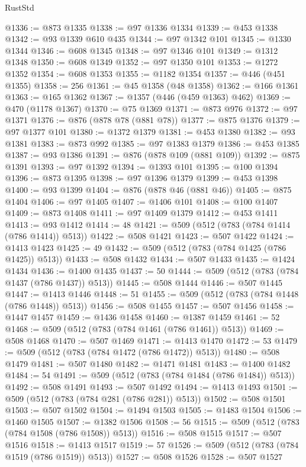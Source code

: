 \begin{lexlean}{RustStd}
\begin{coremodule}
@1336 := @873 @1335
@1338 := @97 @1336 @1334
@1339 := @453 @1338
@1342 := @93 @1339 @610 @435
@1344 := @97 @1342 @101
@1345 := @1330 @1344
@1346 := @608 @1345
@1348 := @97 @1346 @101
@1349 := @1312 @1348
@1350 := @608 @1349
@1352 := @97 @1350 @101
@1353 := @1272 @1352
@1354 := @608 @1353
@1355 := @1182 @1354
@1357 := @446 (@451 @1355)
@1358 := 256
@1361 := @45 @1358 (@48 @1358)
@1362 := @166 @1361
@1363 := @165 @1362
@1367 := @1357 (@446 (@459 @1363) @462)
@1369 := @470 (@1178 @1367)
@1370 := @75 @1369
@1371 := @873 @976
@1372 := @97 @1371
@1376 := @876 (@878 @78 (@881 @78))
@1377 := @875 @1376
@1379 := @97 @1377 @101
@1380 := @1372 @1379
@1381 := @453 @1380
@1382 := @93 @1381
@1383 := @873 @992
@1385 := @97 @1383 @1379
@1386 := @453 @1385
@1387 := @93 @1386
@1391 := @876 (@878 @109 (@881 @109))
@1392 := @875 @1391
@1393 := @97 @1392
@1394 := @1393 @101
@1395 := @100 @1394
@1396 := @873 @1395
@1398 := @97 @1396 @1379
@1399 := @453 @1398
@1400 := @93 @1399
@1404 := @876 (@878 @46 (@881 @46))
@1405 := @875 @1404
@1406 := @97 @1405
@1407 := @1406 @101
@1408 := @100 @1407
@1409 := @873 @1408
@1411 := @97 @1409 @1379
@1412 := @453 @1411
@1413 := @93 @1412
@1414 := 48
@1421 := @509 (@512 (@783 (@784 @1414 (@786 @1414)) @513))
@1422 := @508 @1421
@1423 := @507 @1422
@1424 := @1413 @1423
@1425 := 49
@1432 := @509 (@512 (@783 (@784 @1425 (@786 @1425)) @513))
@1433 := @508 @1432
@1434 := @507 @1433
@1435 := @1424 @1434
@1436 := @1400 @1435
@1437 := 50
@1444 := @509 (@512 (@783 (@784 @1437 (@786 @1437)) @513))
@1445 := @508 @1444
@1446 := @507 @1445
@1447 := @1413 @1446
@1448 := 51
@1455 := @509 (@512 (@783 (@784 @1448 (@786 @1448)) @513))
@1456 := @508 @1455
@1457 := @507 @1456
@1458 := @1447 @1457
@1459 := @1436 @1458
@1460 := @1387 @1459
@1461 := 52
@1468 := @509 (@512 (@783 (@784 @1461 (@786 @1461)) @513))
@1469 := @508 @1468
@1470 := @507 @1469
@1471 := @1413 @1470
@1472 := 53
@1479 := @509 (@512 (@783 (@784 @1472 (@786 @1472)) @513))
@1480 := @508 @1479
@1481 := @507 @1480
@1482 := @1471 @1481
@1483 := @1400 @1482
@1484 := 54
@1491 := @509 (@512 (@783 (@784 @1484 (@786 @1484)) @513))
@1492 := @508 @1491
@1493 := @507 @1492
@1494 := @1413 @1493
@1501 := @509 (@512 (@783 (@784 @281 (@786 @281)) @513))
@1502 := @508 @1501
@1503 := @507 @1502
@1504 := @1494 @1503
@1505 := @1483 @1504
@1506 := @1460 @1505
@1507 := @1382 @1506
@1508 := 56
@1515 := @509 (@512 (@783 (@784 @1508 (@786 @1508)) @513))
@1516 := @508 @1515
@1517 := @507 @1516
@1518 := @1413 @1517
@1519 := 57
@1526 := @509 (@512 (@783 (@784 @1519 (@786 @1519)) @513))
@1527 := @508 @1526
@1528 := @507 @1527

\end{coremodule}
\end{lexlean}
